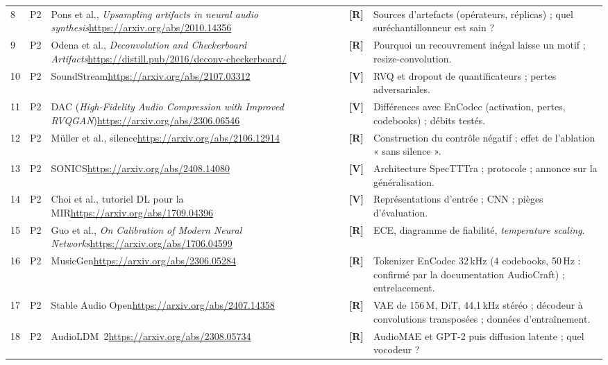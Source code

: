 \documentclass[11pt,a4paper]{article}
\newcommand{\sV}{\textbf{[V]}}
\newcommand{\sR}{\textbf{[R]}}
\begin{document}
{\begin{longtable}{L{0.6cm}L{0.8cm}L{6.1cm}L{1.0cm}L{5.0cm}}
8 & P2 & Pons et al., \emph{Upsampling artifacts in neural audio synthesis}\newline \url{https://arxiv.org/abs/2010.14356} & \sR & Sources d'artefacts (opérateurs, réplicas) ; quel suréchantillonneur est sain ?\\
9 & P2 & Odena et al., \emph{Deconvolution and Checkerboard Artifacts}\newline \url{https://distill.pub/2016/deconv-checkerboard/} & \sR & Pourquoi un recouvrement inégal laisse un motif ; resize-convolution.\\
10 & P2 & SoundStream\newline \url{https://arxiv.org/abs/2107.03312} & \sV & RVQ et dropout de quantificateurs ; pertes adversariales.\\
11 & P2 & DAC (\emph{High-Fidelity Audio Compression with Improved RVQGAN})\newline \url{https://arxiv.org/abs/2306.06546} & \sV & Différences avec EnCodec (activation, pertes, codebooks) ; débits testés.\\
12 & P2 & Müller et al., silence\newline \url{https://arxiv.org/abs/2106.12914} & \sR & Construction du contrôle négatif ; effet de l'ablation « sans silence ».\\
13 & P2 & SONICS\newline \url{https://arxiv.org/abs/2408.14080} & \sV & Architecture SpecTTTra ; protocole ; annonce sur la généralisation.\\
14 & P2 & Choi et al., tutoriel DL pour la MIR\newline \url{https://arxiv.org/abs/1709.04396} & \sV & Représentations d'entrée ; CNN ; pièges d'évaluation.\\
15 & P2 & Guo et al., \emph{On Calibration of Modern Neural Networks}\newline \url{https://arxiv.org/abs/1706.04599} & \sR & ECE, diagramme de fiabilité, \emph{temperature scaling}.\\
16 & P2 & MusicGen\newline \url{https://arxiv.org/abs/2306.05284} & \sR & Tokenizer EnCodec 32\,kHz (4 codebooks, 50\,Hz : confirmé par la documentation AudioCraft) ; entrelacement.\\
17 & P2 & Stable Audio Open\newline \url{https://arxiv.org/abs/2407.14358} & \sR & VAE de 156\,M, DiT, 44,1\,kHz stéréo ; décodeur à convolutions transposées ; données d'entraînement.\\
18 & P2 & AudioLDM~2\newline \url{https://arxiv.org/abs/2308.05734} & \sR & AudioMAE et GPT-2 puis diffusion latente ; quel vocodeur ?\\

\end{longtable}}
\end{document}
